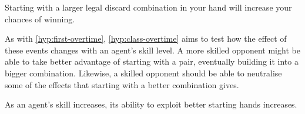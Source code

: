 \documentclass[../main.tex]{subfiles}
\begin{document}
\begin{hyp} \label{hyp:hand-class}
Starting with a larger legal discard combination in your hand will increase your chances of winning.
\end{hyp}

As with \cref{hyp:first-overtime}, \cref{hyp:class-overtime} aims to test how the effect of these events changes with an agent's skill level. A more skilled opponent might be able to take better advantage of starting with a pair, eventually building it into a bigger combination. Likewise, a skilled opponent should be able to neutralise some of the effects that starting with a better combination gives. 

\begin{hyp} \label{hyp:class-overtime}
As an agent's skill increases, its ability to exploit better starting hands increases.
\end{hyp}
\end{document}
